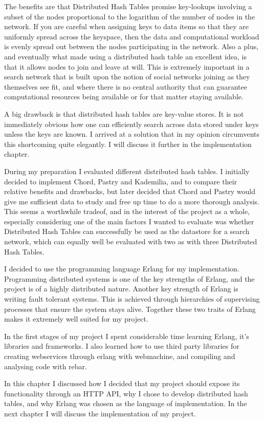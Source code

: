 The benefits are that Distributed Hash Tables promise key-lookups involving a subset of the nodes proportional to the logarithm of the number of nodes in the network. If you are careful when assigning keys to data items so that they are uniformly spread across the keyspace, then the data and computational workload is evenly spread out between the nodes participating in the network. Also a plus, and eventually what made using a distributed hash table an excellent idea, is that it allows nodes to join and leave at will. This is extremely important in a search network that is built upon the notion of social networks joining as they themselves see fit, and where there is no central authority that can guarantee computational resources being available or for that matter staying available.

A big drawback is that distributed hash tables are key-value stores. It is not immediately obvious how one can efficiently search across data stored under keys unless the keys are known. I arrived at a solution that in my opinion circumvents this shortcoming quite elegantly. I will discuss it further in the implementation chapter.

During my preparation I evaluated different distributed hash tables. I initially decided to implement Chord, Pastry and Kademilia, and to compare their relative benefits and drawbacks, but later decided that Chord and Pastry would give me sufficient data to study and free up time to do a more thorough analysis. This seems a worthwhile tradeof, and in the interest of the project as a whole, especially considering one of the main factors I wanted to evaluate was whether Distributed Hash Tables can successfully be used as the datastore for a search network, which can equally well be evaluated with two as with three Distributed Hash Tables.


\mbox{}

I decided to use the programming language Erlang for my implementation. Programming distributed systems is one of the key strengths of Erlang, and the project is of a highly distributed nature. Another key strength of Erlang is writing fault tolerant systems. This is achieved through hierarchies of supervising processes that ensure the system stays alive. Together these two traits of Erlang makes it extremely well suited for my project.

In the first stages of my project I spent considerable time learning Erlang, it's libraries and frameworks. I also learned how to use third party libraries for creating webservices through erlang with webmachine, and compiling and analysing code with rebar.

% 

\mbox{} %

In this chapter I discussed how I decided that my project should expose its functionality through an HTTP API, why I chose to develop distributed hash tables, and why Erlang was chosen as the language of implementation.
In the next chapter I will discuss the implementation of my project.
